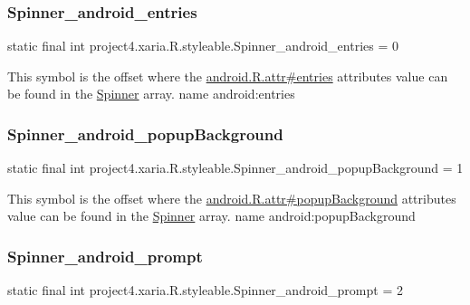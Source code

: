 \subsubsection{\texorpdfstring{Spinner\+\_\+android\+\_\+entries}{Spinner\_android\_entries}}
{\footnotesize\ttfamily static final int project4.\+xaria.\+R.\+styleable.\+Spinner\+\_\+android\+\_\+entries = 0\hspace{0.3cm}{\ttfamily [static]}}

This symbol is the offset where the \hyperlink{}{android.\+R.\+attr\#entries} attribute\textquotesingle{}s value can be found in the \hyperlink{classproject4_1_1xaria_1_1R_1_1styleable_ad3bf2b8838fd43ac4b50c5c40afa1039}{Spinner} array.  name android\+:entries \mbox{\label{classproject4_1_1xaria_1_1R_1_1styleable_ac3a672ea36ed3127190795a3296ee33c}} 
\subsubsection{\texorpdfstring{Spinner\+\_\+android\+\_\+popup\+Background}{Spinner\_android\_popupBackground}}
{\footnotesize\ttfamily static final int project4.\+xaria.\+R.\+styleable.\+Spinner\+\_\+android\+\_\+popup\+Background = 1\hspace{0.3cm}{\ttfamily [static]}}

This symbol is the offset where the \hyperlink{}{android.\+R.\+attr\#popup\+Background} attribute\textquotesingle{}s value can be found in the \hyperlink{classproject4_1_1xaria_1_1R_1_1styleable_ad3bf2b8838fd43ac4b50c5c40afa1039}{Spinner} array.  name android\+:popup\+Background \mbox{\label{classproject4_1_1xaria_1_1R_1_1styleable_a6a2f614c9012639c7b74d674247c4ef8}} 
\subsubsection{\texorpdfstring{Spinner\+\_\+android\+\_\+prompt}{Spinner\_android\_prompt}}
{\footnotesize\ttfamily static final int project4.\+xaria.\+R.\+styleable.\+Spinner\+\_\+android\+\_\+prompt = 2\hspace{0.3cm}{\ttfamily [static]}}

